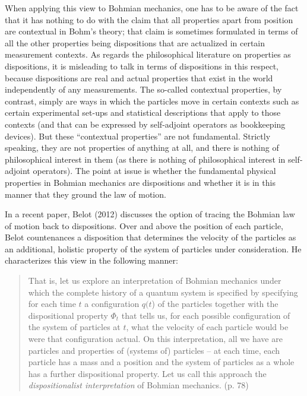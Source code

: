 \documentclass[12pt]{article}
\theoremstyle{definition}
\begin{document}
When applying this view to Bohmian mechanics, one has to be aware of the fact that it has nothing to do with the claim that all properties apart from position are contextual in Bohm's theory; that claim is sometimes formulated in terms of all the other properties being dispositions that are actualized in certain measurement contexts. As regards the philosophical literature on properties as dispositions, it is misleading to talk in terms of dispositions in this respect, because dispositions are real and actual properties that exist in the world independently of any measurements. The so-called contextual properties, by contrast, simply are ways in which the particles move in certain contexts such as certain experimental set-ups and statistical descriptions that apply to those contexts (and that can be expressed by self-adjoint operators as bookkeeping devices). But these ``contextual properties'' are not fundamental. Strictly speaking, they are not properties of anything at all, and there is nothing of philosophical interest in them (as there is nothing of philosophical interest in self-adjoint operators). The point at issue is whether the fundamental physical properties in Bohmian mechanics are dispositions and whether it is in this manner that they ground the law of motion.

In a recent paper, Belot (2012) discusses the option of tracing the Bohmian law of motion back to dispositions. Over and above the position of each particle, Belot countenances a disposition that determines the velocity of the particles as an additional, holistic property of the system of particles under consideration. He characterizes this view in the following manner:

\begin{quote}That is, let us explore an interpretation of Bohmian mechanics under which the complete history of a quantum system is specified by specifying for each time $t$ a configuration $q(t$) of the particles together with the dispositional property $\Phi_t$ that tells us, for each possible configuration of the system of particles at $t$, what the velocity of each particle would be were that configuration actual. On this interpretation, all we have are particles and properties of (systems of) particles -- at each time, each particle has a mass and a position and the system of particles as a whole has a further dispositional property. Let us call this approach the \emph{dispositionalist interpretation} of Bohmian mechanics. (p. 78)\end{quote}
\end{document}
